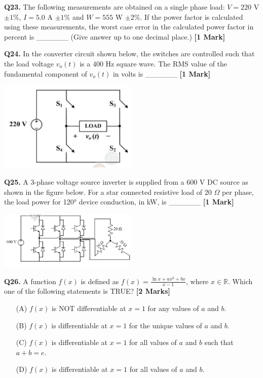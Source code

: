 \documentclass[11pt]{article}
\newcommand{\questiona}[2]{
    \noindent\textbf{Q#2.} #1 \hfill \textbf{[1 Mark]}
}
\newcommand{\questionb}[2]{
    \noindent\textbf{Q#2.} #1 \hfill \textbf{[2 Marks]}
}
\begin{document}
\questiona{The following measurements are obtained on a single phase load: \( V = 220 \) V \( \pm 1\% \), \( I = 5.0 \) A \( \pm 1\% \) and \( W = 555 \) W \( \pm 2\% \). If the power factor is calculated using these measurements, the worst case error in the calculated power factor in percent is \_\_\_\_\_\_ (Give answer up to one decimal place.)}{23}
\vspace{0.5cm}

\questiona{In the converter circuit shown below, the switches are controlled such that the load voltage \( v_o(t) \) is a 400 Hz square wave. The RMS value of the fundamental component of \( v_o(t) \) in volts is \_\_\_\_\_\_}{24}
\begin{center}
\includegraphics[width=0.5\textwidth]{figures/24.png}
\end{center}
\vspace{0.5cm}

\questiona{A 3-phase voltage source inverter is supplied from a 600 V DC source as shown in the figure below. For a star connected resistive load of 20 \( \Omega \) per phase, the load power for 120° device conduction, in kW, is \_\_\_\_\_\_}{25}
\begin{center}
\includegraphics[width=0.5\textwidth]{figures/25.png}
\end{center}
\vspace{0.5cm}

\questionb{A function \( f(x) \) is defined as \( f(x) = \frac{\ln x + ax^2 + bx}{x - 1} \), where \( x \in \mathbb{R} \). Which one of the following statements is TRUE?}{26}
\begin{enumerate}
    \item[(A)] \( f(x) \) is NOT differentiable at \( x = 1 \) for any values of \( a \) and \( b \).  
    \item[(B)] \( f(x) \) is differentiable at \( x = 1 \) for the unique values of \( a \) and \( b \).  
    \item[(C)] \( f(x) \) is differentiable at \( x = 1 \) for all values of \( a \) and \( b \) such that \( a + b = e \).  
    \item[(D)] \( f(x) \) is differentiable at \( x = 1 \) for all values of \( a \) and \( b \).  
\end{enumerate}
\vspace{0.5cm}
\end{document}
